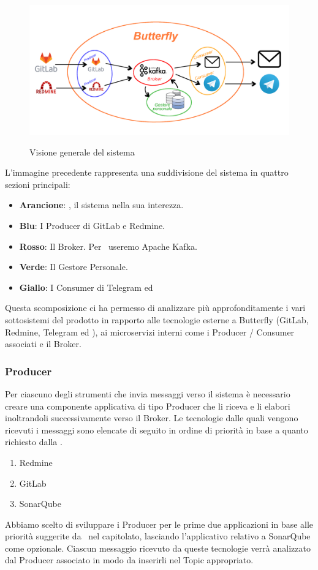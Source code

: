 	\begin{figure}[H]
		\centering
		\includegraphics[width=\textwidth]{img/butterfly.png}\\
		\caption{Visione generale del sistema \progetto}
		\label{fig:butterfly}
	\end{figure}
\newpage
	L'immagine precedente rappresenta una suddivisione del sistema in quattro sezioni principali:
	\begin{itemize}
		\item \textbf{Arancione}: \progetto, il sistema nella sua interezza.
		\item \textbf{Blu}: I Producer di GitLab e Redmine.
		\item \textbf{Rosso}: Il Broker. Per \progetto\ useremo Apache Kafka.
		\item \textbf{Verde}: Il Gestore Personale.
		\item \textbf{Giallo}: I Consumer di Telegram ed \mail
	\end{itemize}
	Questa scomposizione ci ha permesso di analizzare più approfonditamente i vari sottosistemi del prodotto in rapporto alle tecnologie esterne a Butterfly (GitLab, Redmine, Telegram ed \mail), ai microservizi interni come i Producer / Consumer associati e il Broker.

	\subsubsection{Producer}\label{TecnologieProducer}

		Per ciascuno degli strumenti che invia messaggi verso il sistema è necessario creare una componente applicativa di tipo Producer che li riceva e li elabori inoltrandoli successivamente verso il Broker.
		Le tecnologie dalle quali vengono ricevuti i messaggi sono elencate di seguito in ordine di priorità in base a quanto richiesto dalla .
		\begin{enumerate}
			\item Redmine
			\item GitLab
			\item SonarQube
		\end{enumerate}
		Abbiamo scelto di sviluppare i Producer per le prime due applicazioni in base alle priorità suggerite da \II\ nel capitolato, lasciando l'applicativo relativo a SonarQube come opzionale.
		Ciascun messaggio ricevuto da queste tecnologie verrà analizzato dal Producer associato in modo da inserirli nel Topic appropriato.

